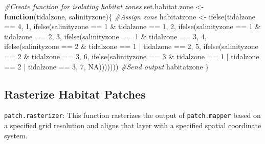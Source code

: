 \documentclass[
]{book}
\newenvironment{Shaded}{\begin{snugshade}}{\end{snugshade}}
\newcommand{\CommentTok}[1]{\textcolor[rgb]{0.56,0.35,0.01}{\textit{#1}}}
\newcommand{\ConstantTok}[1]{\textcolor[rgb]{0.00,0.00,0.00}{#1}}
\newcommand{\ControlFlowTok}[1]{\textcolor[rgb]{0.13,0.29,0.53}{\textbf{#1}}}
\newcommand{\DecValTok}[1]{\textcolor[rgb]{0.00,0.00,0.81}{#1}}
\newcommand{\FunctionTok}[1]{\textcolor[rgb]{0.00,0.00,0.00}{#1}}
\newcommand{\NormalTok}[1]{#1}
\newcommand{\OtherTok}[1]{\textcolor[rgb]{0.56,0.35,0.01}{#1}}
\newcommand{\SpecialCharTok}[1]{\textcolor[rgb]{0.00,0.00,0.00}{#1}}
\begin{document}
\begin{Shaded}
\begin{Highlighting}[]
\CommentTok{\#Create function for isolating habitat zones}
\NormalTok{set.habitat.zone }\OtherTok{\textless{}{-}} \ControlFlowTok{function}\NormalTok{(tidalzone, salinityzone)\{}
  \CommentTok{\#Assign zone}
\NormalTok{  habitatzone }\OtherTok{\textless{}{-}} \FunctionTok{ifelse}\NormalTok{(tidalzone }\SpecialCharTok{==} \DecValTok{4}\NormalTok{, }\DecValTok{1}\NormalTok{,}
          \FunctionTok{ifelse}\NormalTok{(salinityzone }\SpecialCharTok{==} \DecValTok{1} \SpecialCharTok{\&}\NormalTok{ tidalzone }\SpecialCharTok{==} \DecValTok{1}\NormalTok{, }\DecValTok{2}\NormalTok{,}
          \FunctionTok{ifelse}\NormalTok{(salinityzone }\SpecialCharTok{==} \DecValTok{1} \SpecialCharTok{\&}\NormalTok{ tidalzone }\SpecialCharTok{==} \DecValTok{2}\NormalTok{, }\DecValTok{3}\NormalTok{,}
          \FunctionTok{ifelse}\NormalTok{(salinityzone }\SpecialCharTok{==} \DecValTok{1} \SpecialCharTok{\&}\NormalTok{ tidalzone }\SpecialCharTok{==} \DecValTok{3}\NormalTok{, }\DecValTok{4}\NormalTok{,}
          \FunctionTok{ifelse}\NormalTok{(salinityzone }\SpecialCharTok{==} \DecValTok{2} \SpecialCharTok{\&}\NormalTok{ tidalzone }\SpecialCharTok{==} \DecValTok{1} \SpecialCharTok{|}\NormalTok{ tidalzone }\SpecialCharTok{==} \DecValTok{2}\NormalTok{, }\DecValTok{5}\NormalTok{,}
          \FunctionTok{ifelse}\NormalTok{(salinityzone }\SpecialCharTok{==} \DecValTok{2} \SpecialCharTok{\&}\NormalTok{ tidalzone }\SpecialCharTok{==} \DecValTok{3}\NormalTok{, }\DecValTok{6}\NormalTok{,}
          \FunctionTok{ifelse}\NormalTok{(salinityzone }\SpecialCharTok{==} \DecValTok{3} \SpecialCharTok{\&}\NormalTok{ tidalzone }\SpecialCharTok{==} \DecValTok{1} \SpecialCharTok{|}\NormalTok{ tidalzone }\SpecialCharTok{==} \DecValTok{2} \SpecialCharTok{|}\NormalTok{ tidalzone }\SpecialCharTok{==} \DecValTok{3}\NormalTok{, }\DecValTok{7}\NormalTok{, }\ConstantTok{NA}\NormalTok{)))))))}
  \CommentTok{\#Send output}
\NormalTok{  habitatzone}
\NormalTok{\}}
\end{Highlighting}
\end{Shaded}

\hypertarget{rasterize-habitat-patches}{%
\subsection{Rasterize Habitat Patches}\label{rasterize-habitat-patches}}

\texttt{patch.rasterizer}: This function rasterizes the output of \texttt{patch.mapper} based on a specified grid resolution and aligns that layer with a specified spatial coordinate system.
\end{document}
